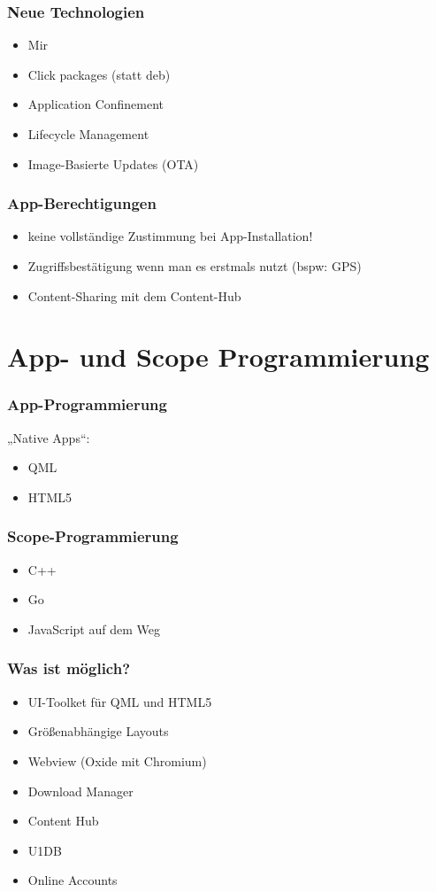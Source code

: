 \documentclass{beamer}
\begin{document}
\begin{frame}
  \frametitle{Neue Technologien}
  \begin{itemize}
    \item Mir
    \item Click packages (statt deb)
    \item Application Confinement
    \item Lifecycle Management
    \item Image-Basierte Updates (OTA)
  \end{itemize}
\end{frame}

\begin{frame}
  \frametitle{App-Berechtigungen}
  \begin{itemize}
    \item keine vollständige Zustimmung bei App-Installation!
    \item Zugriffsbestätigung wenn man es erstmals nutzt (bspw: GPS)
    \item Content-Sharing mit dem Content-Hub
  \end{itemize}
\end{frame}

\section{App- und Scope Programmierung}

\frame{\sectionpage}

\begin{frame}
  \frametitle{App-Programmierung}
  „Native Apps“:
  \begin{itemize}
    \item QML
    \item HTML5
  \end{itemize}
\end{frame}

\begin{frame}
  \frametitle{Scope-Programmierung}
  \begin{itemize}
    \item C++
    \item Go
    \item JavaScript auf dem Weg
  \end{itemize}
\end{frame}

\begin{frame}
  \frametitle{Was ist möglich?}
  \begin{itemize}
    \item UI-Toolket für QML und HTML5
    \item Größenabhängige Layouts
    \item Webview (Oxide mit Chromium)
    \item Download Manager
    \item Content Hub
    \item U1DB
    \item Online Accounts
  \end{itemize}
\end{frame}
\end{document}
